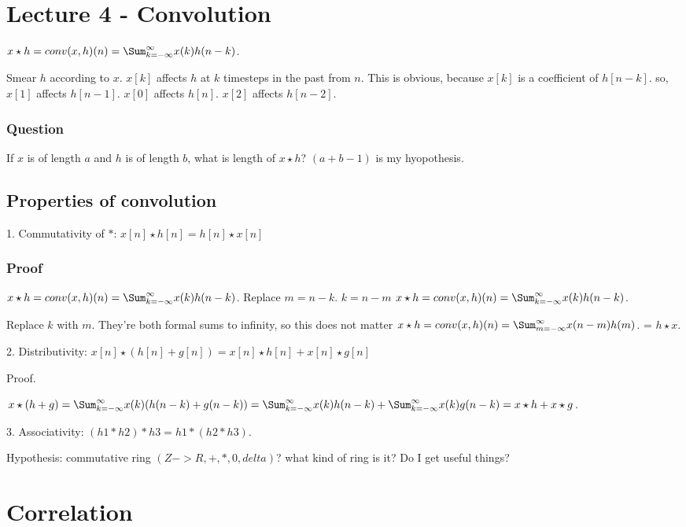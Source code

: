 \documentclass{article}
\begin{document}
\section{Lecture 4 - Convolution}

$x \star h = conv(x, h)(n) = \Sum_{k=-\infty}^\infty x(k) h(n - k)$.

Smear $h$ according to $x$. $x[k]$ affects $h$ at $k$ timesteps in the past from $n$.
This is obvious, because $x[k]$ is a coefficient of $h[n - k]$. so,
$x[1]$ affects $h[n - 1]$. $x[0]$ affects $h[n]$. $x[2]$ affects $h[n - 2]$.

\subsubsection{Question}
If $x$ is of length $a$ and $h$ is of length $b$, what is length of $x \star h$?
$(a + b - 1)$ is my hyopothesis.

\subsection{Properties of convolution}

1. Commutativity of $*$:  $x[n] \star h[n] = h[n] \star x[n]$

\subsubsection{Proof}
$x \star h = conv(x, h)(n) = \Sum_{k=-\infty}^\infty x(k) h(n - k)$.
Replace $m = n - k$. $k = n - m$
$x \star h = conv(x, h)(n) = \Sum_{k=-\infty}^\infty x(k) h(n - k)$.

Replace $k$ with $m$. They're both formal sums to infinity, so this does not matter
$x \star h = conv(x, h)(n) = \Sum_{m=-\infty}^\infty x(n - m) h(m)$.
= $h \star x$.

2. Distributivity:  $x[n] \star (h[n] + g[n]) = x[n] \star h[n] + x[n] \star g[n]$

Proof.

$x \star (h + g) = \Sum_{k=-\infty}^\infty x(k) (h(n - k) + g(n - k)) = \Sum_{k=-\infty}^\infty x(k) h(n - k) + \Sum_{k=-\infty}^\infty x(k) g(n - k) = x \star h + x \star g$.


3. Associativity: $(h1 * h2) * h3 = h1 * (h2 * h3)$.

Hypothesis: commutative ring $(Z -> R, +, *, 0, delta)$? what kind of ring is it? Do I get useful things?


\section{Correlation}
\end{document}
